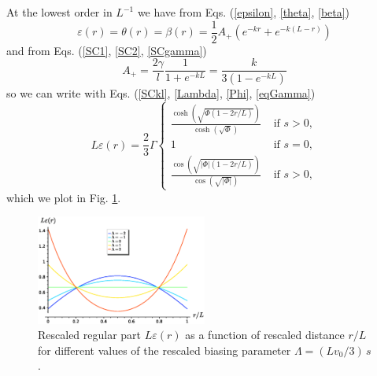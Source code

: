 \documentclass[pre,aps,superscriptaddress,nofootinbib]{revtex4}
\begin{document}
At the lowest order in $L^{-1}$ we have from Eqs. (\ref{epsilon}, \ref{theta}, \ref{beta})
\begin{equation}
\varepsilon(r) = \theta(r) = \beta(r) = \frac{1}{2} A_+ (e^{-kr} + e^{-k(L-r)})
\end{equation}
and from Eqs. (\ref{SC1}, \ref{SC2}, \ref{SCgamma})
\begin{equation}
A_+ = \frac{2\gamma}{l} \frac{1}{1 + e^{-kL}} = \frac{k}{3(1 - e^{-kL})}
\end{equation}
so we can write with Eqs. (\ref{SCkl}, \ref{Lambda}, \ref{Phi}, \ref{eqGamma})
\begin{equation}
L \varepsilon(r) = \frac{2}{3} \Gamma \begin{cases} \frac{\cosh\left(\sqrt{\Phi(1 - 2r/L)}\right)}{\cosh\left(\sqrt{\Phi}\right)} &\text{ if } s > 0, \\ 1 &\text{ if } s = 0, \\ \frac{\cos\left(\sqrt{|\Phi|(1 - 2r/L)}\right)}{\cos\left(\sqrt{|\Phi|}\right)} &\text{ if } s > 0, \end{cases}
\end{equation}
which we plot in Fig. \ref{fig:epsilon}.

\begin{figure}[H]
\centering
\includegraphics[width=0.5\textwidth]{epsilon.eps}
\caption{Rescaled regular part $L \varepsilon(r)$ as a function of rescaled distance $r/L$ for different values of the rescaled biasing parameter $\Lambda = (L v_0/3) \, s$.}
\label{fig:epsilon}
\end{figure}



{\renewcommand{\bibname}{References}}
\end{document}
